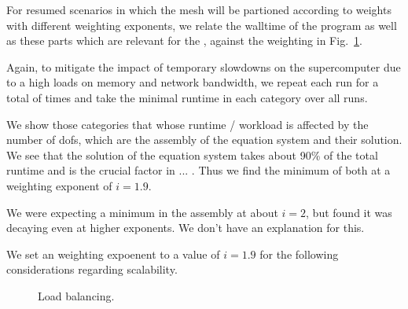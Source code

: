 For resumed scenarios in which the mesh will be partioned according to weights with different weighting exponents, we relate the walltime of the program as well as these parts which are relevant for the , against the weighting in Fig.~\ref{fig:weights}.

Again, to mitigate the impact of temporary slowdowns on the supercomputer due to a high loads on memory and network bandwidth, we repeat each run for a total of  times and take the minimal runtime in each category over all runs.

We show those categories that whose runtime / workload is affected by the number of \glspl{dof}, which are the assembly of the equation system and their solution. We see that the solution of the equation system takes about 90\% of the total runtime and is the crucial factor in ... . Thus we find the minimum of both at a weighting exponent of $i = 1.9$.

We were expecting a minimum in the assembly at about $i = 2$, but found it was decaying even at higher exponents. We don't have an explanation for this.

We set an weighting expoenent to a value of $i = 1.9$ for the following considerations regarding scalability.

\begin{figure}
\centering

\caption{Load balancing.}
\label{fig:weights}
\end{figure}